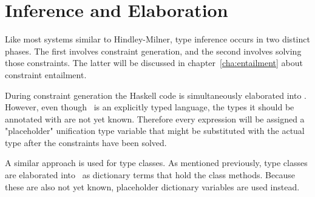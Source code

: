 \chapter{Inference and Elaboration}
\label{cha:inference}
Like most systems similar to Hindley-Milner\cite{hindley}\cite{damas-milner},
type inference occurs in two
distinct phases. The first involves constraint generation, and the second
involves solving those constraints. The latter will be discussed in
chapter~\ref{cha:entailment} about constraint entailment.

During constraint generation the Haskell code is simultaneously elaborated into
\systemfc. However, even though \systemfc~is an explicitly typed language,
the types it should be annotated with are not yet known. Therefore every
expression will be assigned a "placeholder" unification type variable that might
be substituted with the actual type after the constraints have been solved.

A similar approach is used for type classes. As mentioned previously, type
classes are elaborated into \systemfc~as dictionary terms that hold the class
methods. Because these are also not yet known, placeholder dictionary variables
are used instead.


